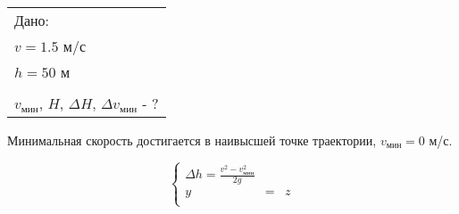 \solutionSection

\begin{tabular}{l|}
    Дано: \\
    $v = 1.5$ м/с \\
    $h = 50$ м \\
    \hline \\
    $v_\text{мин}$, $H$, $\Delta H$, $\Delta v_\text{мин}$ - ?
\end{tabular}

Минимальная скорость достигается в наивысшей точке траектории, $v_\text{мин} = 0$ м/с.

$$\left\{
  \begin{array}{c}
    \Delta h = \frac{v^2 - v_\text{мин}^2}{2g} \\
    y & = & z \\
  \end{array}
\right.$$
